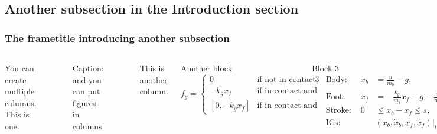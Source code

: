 \documentclass[aspectratio=169,9pt,xcolor=dvipsnames]{beamer}
\begin{document}

\subsection{Another subsection in the Introduction section}

\begin{frame}
\frametitle{The frametitle introducing another subsection}

\begin{columns}[c]

You can create multiple columns.
This is one.
\begin{figure}\label{fig:robot}
\caption{Caption: and you can put figures in columns}
\end{figure}

This is another column.
\begin{block}{Another block}
\begingroup
\small
\begin{equation*}
f_g = 
\begin{cases}
0 & \text{if not in contact,}\\
-k_g x_f &\text{if in contact and foot is sinking,}\\
\left[0, -k_g x_f\right] & \text{if in contact and foot is stationary.}
\end{cases}
\end{equation*}
\endgroup
\end{block}

\begin{block}{Block 3}
\begingroup
\small
\begin{alignat*}{3}
&\text{Body: } &\ddot{x}_b &= \frac{u}{m_b} - g\text{,}\\
&\text{Foot:} &\ddot{x}_f &= -\frac{k_g}{m_f}x_f - g - \frac{u}{m_f}\text{,}\\
&\text{Stroke: } &0 &\leq x_b - x_f \leq s\text{,}\\
&\text{ICs: } &&\left(x_b,\dot{x}_b,x_f,\dot{x}_f\right)\big\rvert_{t=0} = \left(s,v_0,0,v_0\right)\\
\end{alignat*}
\endgroup
\end{block}

\end{columns}
\end{frame}

\end{document}
